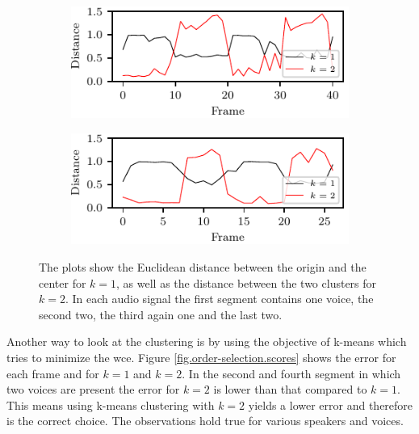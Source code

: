 \begin{figure}[ht]
	\begin{subfigure}[t]{0.48\textwidth}
		\centering
		\includegraphics{figure/elbow/centers_1.pdf}
	\end{subfigure}
	\begin{subfigure}[t]{0.48\textwidth}
		\centering
		\includegraphics{figure/elbow/centers_2.pdf}
	\end{subfigure}%
	\caption{The plots show the Euclidean distance between the origin and the center for $k=1$, as well as the distance between the two clusters for $k=2$. In each audio signal the first segment contains one voice, the second two, the third again one and the last two.}
	\label{fig.order-selection.centers}
\end{figure}

Another way to look at the clustering is by using the objective of k-means which tries to minimize the \gls{wce}. Figure \ref{fig.order-selection.scores} shows the error for each frame and for $k=1$ and $k=2$. In the second and fourth segment in which two voices are present the error for $k=2$ is lower than that compared to $k=1$.
This means using k-means clustering with $k=2$ yields a lower error and therefore is the correct choice. The observations hold true for various speakers and voices.

